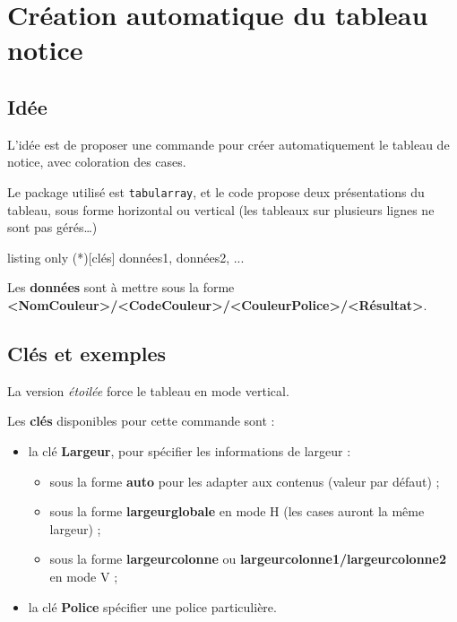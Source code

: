 \documentclass{article}
\newcommand\Cle[1]{{\bfseries\sffamily\textlangle #1\textrangle}}
\begin{document}
\section{Création automatique du tableau notice}

\subsection{Idée}

L'idée est de proposer une commande pour créer automatiquement le tableau de notice, avec coloration des cases.

\smallskip

Le package utilisé est \texttt{tabularray}, et le code propose deux présentations du tableau, sous forme horizontal ou vertical (les tableaux sur plusieurs lignes ne sont pas gérés\ldots)

\begin{PresentationCode}{listing only}
\TablCouleursPixelArt(*)[clés]{%
	données1,%
	données2,%
	...
}
\end{PresentationCode}

Les \Cle{données} sont à mettre sous la forme \Cle{<NomCouleur>/<CodeCouleur>/<CouleurPolice>/<Résultat>}.

\subsection{Clés et exemples}

La version \textit{étoilée} force le tableau en mode vertical.

\smallskip

Les \Cle{clés} disponibles pour cette commande sont :

\begin{itemize}
	\item la clé \Cle{Largeur}, pour spécifier les informations de largeur :
	\begin{itemize}
		\item sous la forme \Cle{auto} pour les adapter aux contenus (valeur par défaut) ;
		\item sous la forme \Cle{largeurglobale} en mode H (les cases auront la même largeur) ;
		\item sous la forme \Cle{largeurcolonne} ou \Cle{largeurcolonne1/largeurcolonne2} en mode V ;
	\end{itemize}
	\item la clé \Cle{Police} spécifier une police particulière.
\end{itemize}
\end{document}
